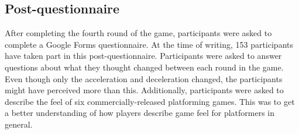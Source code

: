 


\subsection{Post-questionnaire}
After completing the fourth round of the game, participants were asked to complete a Google Forms questionnaire. At the time of writing, 153 participants have taken part in this post-questionnaire. Participants were asked to answer questions about what they thought changed between each round in the game. Even though only the acceleration and deceleration changed, the participants might have perceived more than this. Additionally, participants were asked to describe the feel of six commercially-released platforming games. This was to get a better understanding of how players describe game feel for platformers in general.


